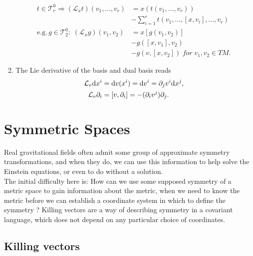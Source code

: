 \begin{enumerate}
	\begin{align}
		t\in \mathcal{T}^0_r \Rightarrow (\mathcal{L}_x t)(v_1, \dots,v_r) &= x(t(v_1,\dots,v_r))\nonumber \\
		& - \sum_{i=1}^r t(v_1,\dots,[x,v_i],\dots,v_r) \\
		\mathrm{e.g.} \, g \in \mathcal{T}^0_2:\; (\mathcal{L}_x g)(v_1,v_2) &= x[g(v_1,v_2)] \nonumber \\
		&-g([x,v_1],v_2) \nonumber \\
		&- g(v,[x,v_2]) \; for \; v_1,v_2 \in TM.
	\end{align}
\item The Lie derivative of the basis and dual basis reads
\begin{align}
	\mathcal{L}_v \mathrm{d} x^i &= \mathrm{d} v(x^i) = \mathrm{d} v^i = \partial_j v^i \mathrm{d} x^j, \\
	\mathcal{L}_v \partial_i &= [v,\partial_i] = -(\partial_i v^j) \partial_j.
\end{align}
\end{enumerate}






\newpage
\section{Symmetric Spaces}
Real gravitational fields often admit some group of approximate symmetry transformations, and when they do, we can use this information to help solve the Einstein equations, or even to do without a solution.\\
The initial difficulty here is: How can we use some supposed symmetry of a metric space to gain information about the metric, when we need to know the metric before we can establish a coordinate system in which to define the symmetry ? Killing vectors are a way of describing symmetry in a covariant language, which does not depend on any particular choice of coordinates.


\subsection{Killing vectors}

